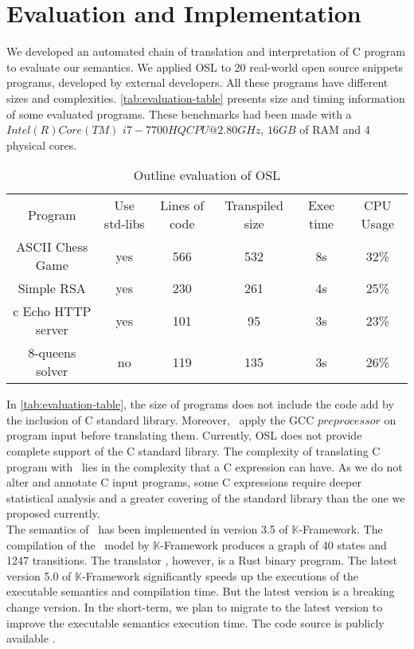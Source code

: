 \section{Evaluation and Implementation}
\label{sec:imp-eval}


We developed an automated chain of translation and interpretation of C program to evaluate our semantics. We applied OSL to 20 real-world open source snippets programs, developed by external developers. All these programs have different sizes and complexities. \autoref{tab:evaluation-table} presents size and timing information of some evaluated programs. These benchmarks had been made with a $Intel(R) Core(TM)$ $i7-7700HQCPU @ 2.80GHz$, $16GB$ of RAM and 4 physical cores.

\begin{table}[h]
  \centering
  \begin{tabular}{ | c | c | c | c | c | c | }
  \hline
    Program & Use std-libs & Lines of code  & Transpiled size & Exec time & CPU Usage \\ \hhline{|=|=|=|=|=|=|}
    ASCII Chess Game & yes  & 566 & 532 & 8s & 32\% \\ \hline
    Simple RSA & yes & 230 & 261 & 4s & 25\% \\ \hline
c    Echo HTTP server & yes &  101 & 95 & 3s & 23\% \\ \hline
    8-queens solver &  no & 119 & 135 & 3s & 26\% \\
    \hline 
  \end{tabular}
  \vspace{\baselineskip}
  \caption{Outline evaluation of OSL}
  \label{tab:evaluation-table}
\end{table}

In \autoref{tab:evaluation-table}, the size of programs does not include the code add by the inclusion of C standard library. Moreover,
\oslt~apply the GCC $preprocessor$ on program input before translating them. Currently, OSL does not provide complete
support of the C standard library. The complexity of translating C program with \oslt~lies in the complexity that a C expression can have.
As we do not alter and annotate C input programs, some C expressions require deeper statistical analysis and a greater covering of the standard library than the one we proposed currently.\\

The semantics of \oslos~has been implemented in version 3.5 of $\mathbb{K}$-Framework.
The compilation of the \oslos~model by $\mathbb{K}$-Framework produces a graph of 40 states and 1247 transitions.
The translator \oslt, however, is a Rust binary program.
The latest version 5.0 of $\mathbb{K}$-Framework significantly speeds up the executions of the executable semantics and compilation time.
But the latest version is a breaking change version. In the short-term, we plan to migrate to the latest version to improve the executable semantics execution time.
The code source is publicly available \cite{OSL}.